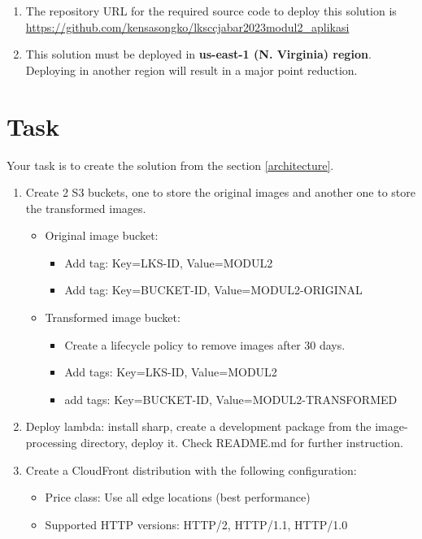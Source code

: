 \documentclass{article}
\begin{document}
\begin{enumerate}
\item The repository URL for the required source code to deploy this solution is \href{https://github.com/kensasongko/lksccjabar2023modul2_aplikasi}{https://github.com/kensasongko/lksccjabar2023modul2\_aplikasi}
\item This solution must be deployed in \textbf{us-east-1 (N. Virginia) region}. Deploying in another region will result in a major point reduction.
\end{enumerate}

\section{Task}
Your task is to create the solution from the section \ref{architecture}.
\begin{enumerate}
\item Create 2 S3 buckets, one to store the original images and another one to store the transformed images.
  \begin{itemize}
    \item Original image bucket:
    \begin{itemize}
      \item Add tag: Key=LKS-ID, Value=MODUL2
      \item Add tag: Key=BUCKET-ID, Value=MODUL2-ORIGINAL
    \end{itemize}
    \item Transformed image bucket:
    \begin{itemize}
      \item Create a lifecycle policy to remove images after 30 days.
      \item Add tags: Key=LKS-ID, Value=MODUL2
      \item add tags: Key=BUCKET-ID, Value=MODUL2-TRANSFORMED
    \end{itemize}
  \end{itemize}
\item Deploy lambda: install sharp, create a development package from the image-processing directory, deploy it. Check README.md for further instruction.
\item Create a CloudFront distribution with the following configuration:
  \begin{itemize}
    \item Price class: Use all edge locations (best performance)
    \item Supported HTTP versions: HTTP/2, HTTP/1.1, HTTP/1.0

\end{itemize}
\end{enumerate}
\end{document}
